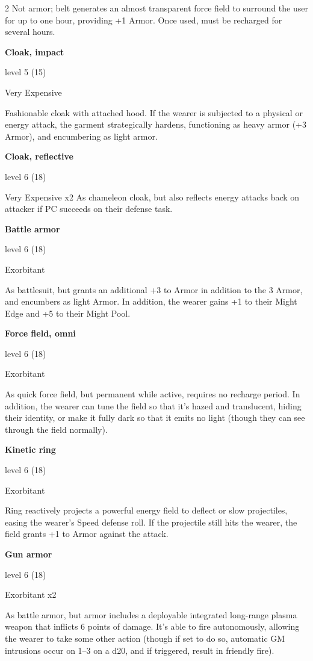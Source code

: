 \begin{multicols}{2}
Not armor; belt generates an almost transparent force field to surround the user for up to one hour, providing +1 Armor. Once used, must be recharged for several hours. 

\textbf{Cloak, impact}

level 5 (15) 

Very Expensive 

Fashionable cloak with attached hood. If the wearer is subjected to a physical or energy attack, the garment strategically hardens, functioning as heavy armor (+3 Armor), and encumbering as light armor. 

\textbf{Cloak, reflective}

level 6 (18) 

Very Expensive x2 As chameleon cloak, but also reflects energy attacks back on attacker if PC succeeds on their defense task.

\textbf{Battle armor}

level 6 (18) 

Exorbitant

As battlesuit, but grants an additional +3 to Armor in addition to the 3 Armor, and encumbers as light Armor. In addition, the wearer gains +1 to their Might Edge and +5 to their Might Pool.

\textbf{Force field, omni} 

level 6 (18) 

Exorbitant

As quick force field, but permanent while active, requires no recharge period. In addition, the wearer can tune the field so that it’s hazed and translucent, hiding their identity, or make it fully dark so that it emits no light (though they can see through the field normally).

\textbf{Kinetic ring}

level 6 (18) 

Exorbitant

Ring reactively projects a powerful energy field to deflect or slow projectiles, easing the wearer’s Speed defense roll. If the projectile still hits the wearer, the field grants +1 to Armor against the attack.

\textbf{Gun armor}

level 6 (18) 

Exorbitant x2

As battle armor, but armor includes a deployable integrated long-range plasma weapon that inflicts 6 points of damage. It’s able to fire autonomously, allowing the wearer to take some other action (though if set to do so, automatic GM intrusions occur on 1–3 on a d20, and if triggered, result in friendly fire).


\end{multicols}

